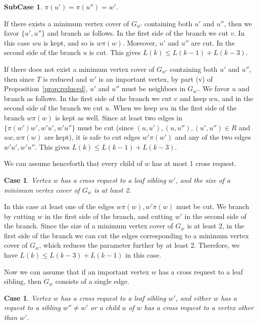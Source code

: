\documentclass[11pt]{article}
\newtheorem{case}[theorem]{Case}
\newtheorem{subcase}[theorem]{SubCase}
\begin{document}
\begin{subcase}\label{subcase:32}
$\pi(u') = \pi(u'')= w'$.
\end{subcase}

If there exists a minimum vertex cover of $G_{w'}$ containing both $u'$ and $u''$, then we favor $\{u', u''\}$ and branch as follows. In the first side of the branch we cut $v$. In this case $wu$ is kept, and so is $w\pi(w)$. Moreover, $u'$ and $u''$ are cut. In the second side of the branch $u$ is cut. This gives $L(k) \leq L(k-1) + L(k-3)$.

If there does not exist a minimum vertex cover of $G_{w'}$ containing both $u'$ and $u''$, then since $T$ is reduced and $w'$ is an important vertex, by part (v) of Proposition~\ref{prop:reduced}, $u'$ and $u''$ must be neighbors in $G_{w'}$. We favor $u$ and branch as follows. In the first side of the branch we cut $v$ and keep $wu$, and in the second side of the branch we cut $u$. When we keep $wu$ in the first side of the branch $w\pi(w)$ is kept as well. Since at least two edges in $\{\pi(w')w', w'u', w'u''\}$ must be cut (since $(u, u'), (u, u''), (u', u'') \in R$ and $uw, w\pi(w)$ are kept), it is safe to cut edges $w'\pi(w')$ and any of the two edges $w'u', w'u''$. This gives $L(k) \leq L(k-1) + L(k-3)$.


We can assume henceforth that every child of $w$ has at most 1 cross request.


\begin{case}\label{case:4}
Vertex $w$ has a cross request to a leaf sibling $w'$, and the size of a minimum vertex cover of $G_w$ is at least 2.
\end{case}

In this case at least one of the edges $w\pi(w), w'\pi(w)$ must be cut. We branch by cutting $w$ in the first side of the branch, and cutting $w'$ in the second side of the branch. Since the size of a minimum vertex cover of $G_w$ is at least 2, in the first side of the branch we can cut the edges corresponding to a minimum vertex cover of $G_w$, which reduces the parameter further by at least 2. Therefore, we have $L(k) \leq L(k-3) + L(k-1)$ in this case.

Now we can assume that if an important vertex $w$ has a cross request to a leaf sibling, then $G_w$ consists of a single edge.

\begin{case}\label{case:5}
Vertex $w$ has a cross request to a leaf sibling $w'$, and either $w$ has a request to a sibling $w'' \neq w'$ or a child $u$ of $w$ has a cross request to a vertex other than $w'$.
\end{case}
\end{document}
